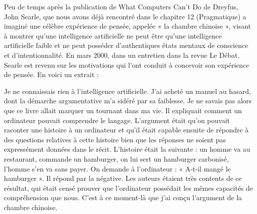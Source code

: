 Peu de temps après la publication de What Computers Can't Do de Dreyfus, John Searle, que nous avons déjà rencontré dans le chapitre 12 (Pragmatique) a imaginé une célèbre expérience de pensée, appelée « la chambre chinoise », visant à montrer qu’une intelligence artificielle ne peut être qu’une intelligence artificielle faible et ne peut posséder d’authentiques états mentaux de conscience et d’intentionnalité. En mars 2000, dans un entretien dans la revue Le Débat, Searle est revenu sur les motivations qui l’ont conduit à concevoir son expérience de pensée. En voici un extrait :\par


Je ne connaissais rien à l'intelligence artificielle. J'ai acheté un manuel au hasard, dont la démarche argumentative m'a sidéré par sa faiblesse. Je ne savais pas alors que ce livre allait marquer un tournant dans ma vie. Il expliquait comment un ordinateur pouvait comprendre le langage. L'argument était qu'on pouvait raconter une histoire à un ordinateur et qu'il était capable ensuite de répondre à des questions relatives à cette histoire bien que les réponses ne soient pas expressément données dans le récit. L'histoire était la suivante : un homme va au restaurant, commande un hamburger, on lui sert un hamburger carbonisé, l'homme s'en va sans payer. On demande à l'ordinateur : « A-t-il mangé le hamburger ». Il répond par la négative. Les auteurs étaient très contents de ce résultat, qui était censé prouver que l'ordinateur possédait les mêmes capacités de compréhension que nous. C'est à ce moment-là que j'ai conçu l'argument de la chambre chinoise.\par


